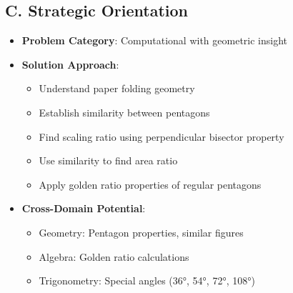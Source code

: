 \documentclass[12pt]{article}
\begin{document}
\begin{problemconfigbox}
\subsection*{C. Strategic Orientation}
\begin{itemize}[leftmargin=*]
    \item \textbf{Problem Category}: Computational with geometric insight
    \item \textbf{Solution Approach}: 
    \begin{itemize}
        \item Understand paper folding geometry
        \item Establish similarity between pentagons
        \item Find scaling ratio using perpendicular bisector property
        \item Use similarity to find area ratio
        \item Apply golden ratio properties of regular pentagons
    \end{itemize}
    \item \textbf{Cross-Domain Potential}: 
    \begin{itemize}
        \item Geometry: Pentagon properties, similar figures
        \item Algebra: Golden ratio calculations
        \item Trigonometry: Special angles (36°, 54°, 72°, 108°)
    \end{itemize}
\end{itemize}
\end{problemconfigbox}
\end{document}
